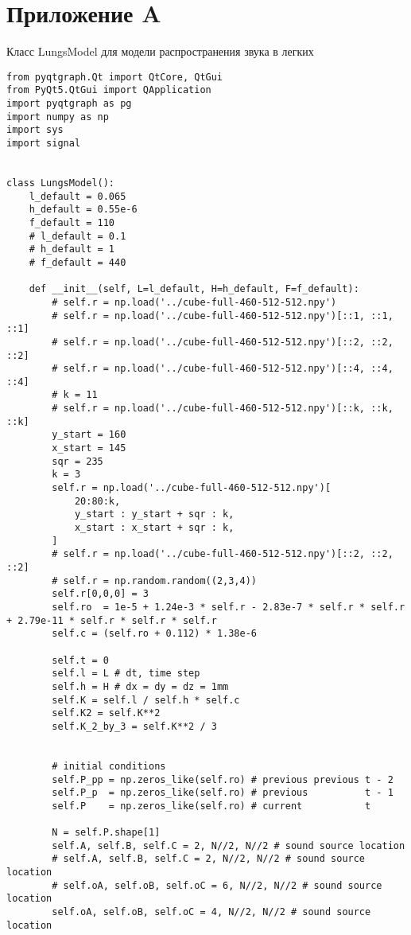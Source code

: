 \documentclass[../main.tex]{subfiles}
\begin{document}
\section*{Приложение A}
\label{appendix1}
Класс LungsModel для модели распространения звука в легких

\begin{lstlisting}
from pyqtgraph.Qt import QtCore, QtGui
from PyQt5.QtGui import QApplication
import pyqtgraph as pg
import numpy as np
import sys
import signal


class LungsModel():
    l_default = 0.065
    h_default = 0.55e-6
    f_default = 110
    # l_default = 0.1
    # h_default = 1
    # f_default = 440

    def __init__(self, L=l_default, H=h_default, F=f_default):
        # self.r = np.load('../cube-full-460-512-512.npy')
        # self.r = np.load('../cube-full-460-512-512.npy')[::1, ::1, ::1]
        # self.r = np.load('../cube-full-460-512-512.npy')[::2, ::2, ::2]
        # self.r = np.load('../cube-full-460-512-512.npy')[::4, ::4, ::4]
        # k = 11
        # self.r = np.load('../cube-full-460-512-512.npy')[::k, ::k, ::k]
        y_start = 160
        x_start = 145
        sqr = 235
        k = 3
        self.r = np.load('../cube-full-460-512-512.npy')[
            20:80:k,
            y_start : y_start + sqr : k,
            x_start : x_start + sqr : k,
        ]
        # self.r = np.load('../cube-full-460-512-512.npy')[::2, ::2, ::2]
        # self.r = np.random.random((2,3,4))
        self.r[0,0,0] = 3
        self.ro  = 1e-5 + 1.24e-3 * self.r - 2.83e-7 * self.r * self.r + 2.79e-11 * self.r * self.r * self.r
        self.c = (self.ro + 0.112) * 1.38e-6

        self.t = 0
        self.l = L # dt, time step
        self.h = H # dx = dy = dz = 1mm
        self.K = self.l / self.h * self.c
        self.K2 = self.K**2
        self.K_2_by_3 = self.K**2 / 3


        # initial conditions
        self.P_pp = np.zeros_like(self.ro) # previous previous t - 2
        self.P_p  = np.zeros_like(self.ro) # previous          t - 1
        self.P    = np.zeros_like(self.ro) # current           t

        N = self.P.shape[1]
        self.A, self.B, self.C = 2, N//2, N//2 # sound source location
        # self.A, self.B, self.C = 2, N//2, N//2 # sound source location
        # self.oA, self.oB, self.oC = 6, N//2, N//2 # sound source location
        self.oA, self.oB, self.oC = 4, N//2, N//2 # sound source location


\end{lstlisting}
\end{document}
